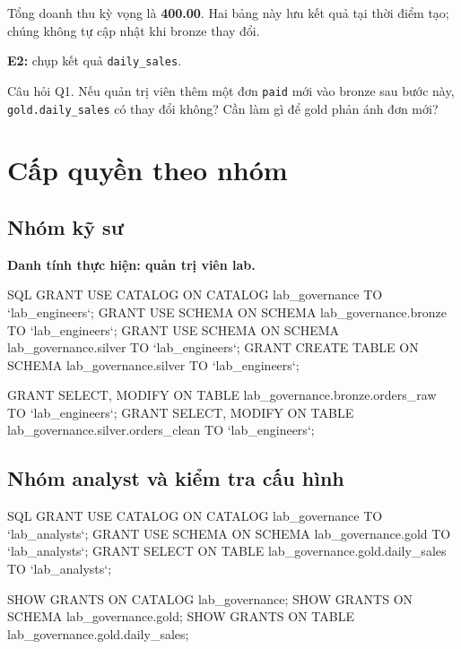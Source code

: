 Tổng doanh thu kỳ vọng là \textbf{400.00}. Hai bảng này lưu kết quả tại thời điểm tạo; chúng không tự cập nhật khi bronze thay đổi.


\begin{evidencebox}
\textbf{E2:} chụp kết quả \texttt{daily\_\allowbreak{}sales}.
\end{evidencebox}

\begin{questionbox}{Câu hỏi Q1.}
Nếu quản trị viên thêm một đơn \texttt{paid} mới vào bronze sau bước này, \texttt{gold.\allowbreak{}daily\_\allowbreak{}sales} có thay đổi không? Cần làm gì để gold phản ánh đơn mới?
\end{questionbox}

\section{Cấp quyền theo nhóm}

\subsection{Nhóm kỹ sư}

\textbf{Danh tính thực hiện: quản trị viên lab.}\par\nopagebreak

\begin{aivncodebox}[language={}]{SQL}
GRANT USE CATALOG ON CATALOG lab_governance TO `lab_engineers`;
GRANT USE SCHEMA ON SCHEMA lab_governance.bronze TO `lab_engineers`;
GRANT USE SCHEMA ON SCHEMA lab_governance.silver TO `lab_engineers`;
GRANT CREATE TABLE ON SCHEMA lab_governance.silver TO `lab_engineers`;

GRANT SELECT, MODIFY ON TABLE lab_governance.bronze.orders_raw TO `lab_engineers`;
GRANT SELECT, MODIFY ON TABLE lab_governance.silver.orders_clean TO `lab_engineers`;
\end{aivncodebox}

\subsection{Nhóm analyst và kiểm tra cấu hình}

\begin{aivncodebox}[language={}]{SQL}
GRANT USE CATALOG ON CATALOG lab_governance TO `lab_analysts`;
GRANT USE SCHEMA ON SCHEMA lab_governance.gold TO `lab_analysts`;
GRANT SELECT ON TABLE lab_governance.gold.daily_sales TO `lab_analysts`;

SHOW GRANTS ON CATALOG lab_governance;
SHOW GRANTS ON SCHEMA lab_governance.gold;
SHOW GRANTS ON TABLE lab_governance.gold.daily_sales;
\end{aivncodebox}

